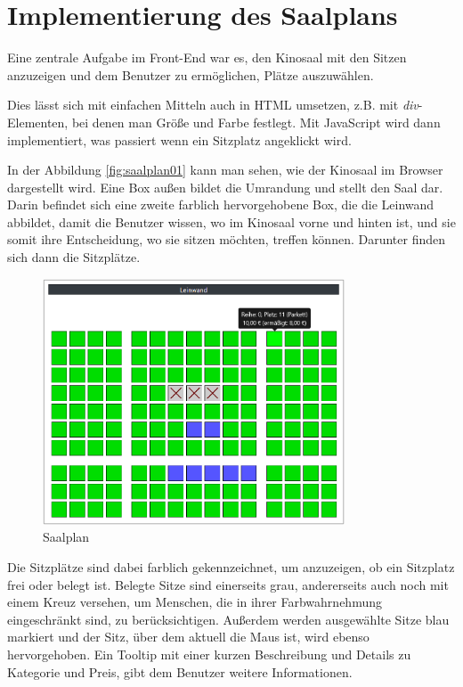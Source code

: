\section{Implementierung des Saalplans}

Eine zentrale Aufgabe im Front-End war es, den Kinosaal mit den Sitzen anzuzeigen und dem Benutzer zu ermöglichen, Plätze auszuwählen.

Dies lässt sich mit einfachen Mitteln auch in \acs{HTML} umsetzen, z.B. mit \textit{div}-Elementen, bei denen man Größe und Farbe festlegt.
Mit JavaScript wird dann implementiert, was passiert wenn ein Sitzplatz angeklickt wird.

In der Abbildung \vref{fig:saalplan01} kann man sehen, wie der Kinosaal im Browser dargestellt wird.
Eine Box außen bildet die Umrandung und stellt den Saal dar.
Darin befindet sich eine zweite farblich hervorgehobene Box, die die Leinwand abbildet, damit die Benutzer wissen, wo im Kinosaal vorne und hinten ist, und sie somit ihre Entscheidung, wo sie sitzen möchten, treffen können.
Darunter finden sich dann die Sitzplätze.

\begin{figure}[ht]
	\centering
	\includegraphics[width=0.8\textwidth]{img/screenshots/saalplan01}
	\captionsetup{format=hang}
	\caption{\label{fig:saalplan01}Saalplan}
\end{figure}

Die Sitzplätze sind dabei farblich gekennzeichnet, um anzuzeigen, ob ein Sitzplatz frei oder belegt ist.
Belegte Sitze sind einerseits grau, andererseits auch noch mit einem Kreuz versehen, um Menschen, die in ihrer Farbwahrnehmung eingeschränkt sind, zu berücksichtigen.
Außerdem werden ausgewählte Sitze blau markiert und der Sitz, über dem aktuell die Maus ist, wird ebenso hervorgehoben.
Ein Tooltip mit einer kurzen Beschreibung und Details zu Kategorie und Preis, gibt dem Benutzer weitere Informationen.

